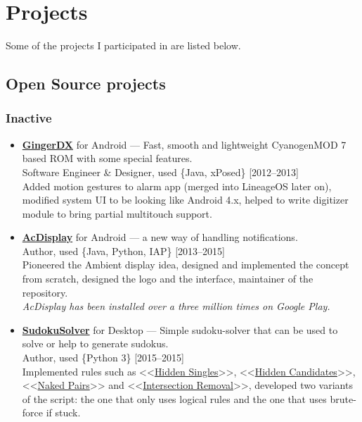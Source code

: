 \documentclass[a4paper]{article}
\begin{document}
	\section*{Projects}
	Some of the projects I participated in are listed below. 
	\subsection*{Open Source projects}
	\subsubsection*{Inactive}
	\begin{itemize}
		\item \href{https://forum.xda-developers.com/showthread.php?t=1188486}{\textbf{GingerDX}} for Android --- Fast, smooth and lightweight CyanogenMOD 7 based ROM with some special features. \\[0.2em]
		{\footnotesize Software Engineer \& Designer, used \{Java, xPosed\} \hfill [2012--2013]} \\[0.2em] 
		Added motion gestures to alarm app (merged into LineageOS later on), modified system UI to be looking like Android 4.x, helped to write digitizer module to bring partial multitouch support. 

		\item \href{http://artemchep.com/acdisplay/}{\textbf{AcDisplay}} for Android --- a new way of handling notifications. \\[0.2em]
		{\footnotesize Author, used \{Java, Python, IAP\} \hfill [2013--2015]} \\[0.2em]
		Pioneered the Ambient display idea, designed and implemented the concept from scratch, designed the logo and the interface, maintainer of the repository.\\[0.2em]
		\textit{AcDisplay has been installed over a three million times on Google Play.} 

		\item \href{https://github.com/AChep/SudokuSolver}{\textbf{SudokuSolver}} for Desktop --- Simple sudoku-solver that can be used to solve or help to generate sudokus. \\[0.2em]
		{\footnotesize Author, used \{Python 3\} \hfill [2015--2015]} \\[0.2em]
		Implemented rules such as <<\href{http://www.sudokuwiki.org/Getting_Started}{Hidden Singles}>>, <<\href{http://www.sudokuwiki.org/Hidden_Candidates}{Hidden Candidates}>>, <<\href{http://www.sudokuwiki.org/Naked_Candidates#NP}{Naked Pairs}>> and <<\href{http://www.sudokuwiki.org/intersection_removal}{Intersection Removal}>>, developed two variants of the script: the one that only uses logical rules and the one that uses brute-force if stuck.
	\end{itemize}
\end{document}
